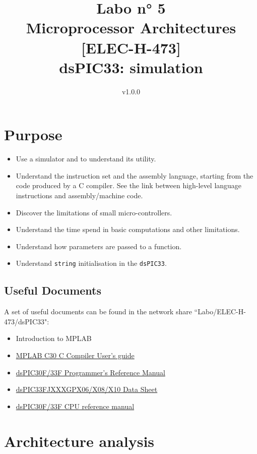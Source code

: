 \documentclass[10pt,a4paper]{article}
\date{\vspace{-1cm}v1.0.0}
\title{\vspace{-2cm} Labo n° 5\\ Microprocessor Architectures [ELEC-H-473]\\ dsPIC33: simulation \ifthenelse{\boolean{corrige}}{~\\Corrigé}{}}
\theoremstyle{definition}%
\newcommand{\kw}[1]{\texttt{#1}}
\begin{document}
\maketitle

\section*{ Purpose}
\begin{itemize}
\item Use a simulator and to understand its utility.
\item Understand the instruction set and the assembly language, starting from the code produced by a C compiler. See the link between high-level language instructions and assembly/machine code.
\item Discover the limitations of small micro-controllers.
\item Understand the time spend in basic computations and other limitations.
\item Understand how parameters are passed to a function.
\item Understand \kw{string} initialisation in the \kw{dsPIC33}.
\end{itemize}


\subsection*{Useful Documents}
A set of useful documents can be found in the network share ``Labo/ELEC-H-473/dsPIC33": %
\begin{itemize}
\item Introduction to MPLAB
\item \href{http://ww1.microchip.com/downloads/en/devicedoc/c30_users_guide_51284f.pdf}{MPLAB C30 C Compiler User's guide }
\item \href{http://ww1.microchip.com/downloads/en/DeviceDoc/70157C.pdf}{dsPIC30F/33F Programmer's Reference Manual}
\item \href{http://ww1.microchip.com/downloads/en/DeviceDoc/70286C.pdf}{dsPIC33FJXXXGPX06/X08/X10 Data Sheet}
\item \href{http://ww1.microchip.com/downloads/en/DeviceDoc/70204C.pdf}{dsPIC30F/33F CPU reference manual}
\end{itemize}

\section{Architecture analysis}
\end{document}
